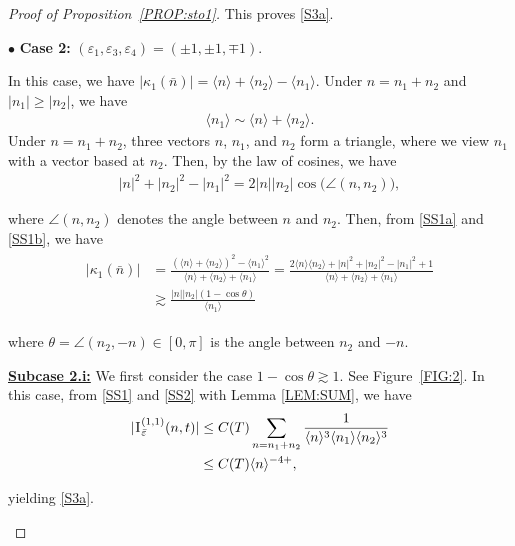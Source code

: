 \documentclass[%
11pt,  reqno]{amsart}
\newcommand{\1}{\hspace{0.2mm}\text{I}\hspace{0.2mm}}
\newcommand{\noi}{\noindent}
\newcommand{\eps}{\varepsilon}
\newcommand{\kk}{\kappa}
\newcommand{\ta}{\theta}
\newcommand{\ges}{\gtrsim}
\newcommand{\jb}[1]
{\langle #1 \rangle}
\numberwithin{equation}{section}
\numberwithin{theorem}{section}
\begin{document}
\begin{proof}[Proof of Proposition~\ref{PROP:sto1}]
\noi
This proves \eqref{S3a}.

\medskip

\noi
$\bullet$ {\bf Case 2:}
$(\eps_1, \eps_3, \eps_4) = (\pm 1, \pm1, \mp1)$.

In this case, we have
$|\kk_1(\bar n)|=  \jb{n} + \jb{n_2} -\jb{n_1}$.
Under $n = n_1 + n_2$
and  $|n_1| \geq |n_2|$, we have 
\begin{align}
\jb{n_1} \sim \jb{n}+ \jb{n_2}.
\label{SS1a}
\end{align}
Under $ n = n_1 + n_2$, 
three vectors $n$, $n_1$, and $n_2$ form a triangle,
where we view $n_1$ with a vector based at $n_2$.
Then, 
by the law of cosines, we have
\begin{align}
|n|^2 + |n_2|^2 - |n_1|^2 = 2 |n| |n_2| \cos \big( \angle(n, n_2)\big),  
\label{SS1b}
\end{align}

\noi
where
$\angle(n, n_2)$ denotes the angle between $n$ and $n_2$.
Then, from \eqref{SS1a} and \eqref{SS1b}, 
we have
\begin{align}
\begin{split}
|\kk_1(\bar n)| 
& =  \frac{(\jb{n} + \jb{n_2})^2 -\jb{n_1}^2}
{\jb{n} + \jb{n_2} +\jb{n_1}}
  =  \frac{2\jb{n}\jb{n_2} + |n|^2 + |n_2|^2 - |n_1|^2 + 1}
{\jb{n} + \jb{n_2} +\jb{n_1}}\\
& 
\ges
 \frac{|n| |n_2| (1 - \cos \theta)}
{\jb{n_1}} 
\end{split}
\label{SS2}
\end{align}

\noi
where $\ta = \angle(n_2, -n) \in [0, \pi]$ is the angle between $n_2$ and $-n$.



\smallskip
\noi
{\bf \underline{Subcase 2.i:}}
We first consider the case $1 - \cos \ta \ges 1$.
See Figure~\ref{FIG:2}.
In this case, from \eqref{SS1} and \eqref{SS2}
with Lemma \ref{LEM:SUM}, 
we have 
\begin{align}
\begin{split}
|\1^{(1,1)}_{\bar \eps} (n, t)|
& \le C(T)   
\sum_{n = n_1 + n_2} 
\frac{1}{\jb{n}^{3}\jb{n_1} \jb{n_2}^{3}}\\
& \le C(T)   
\jb{n}^{-4+}, 
\end{split}
\label{SS3}
\end{align}

\noi
yielding \eqref{S3a}.

\begin{figure}[h]
\begin{tikzpicture}


\end{tikzpicture}
\end{figure}
\end{proof}
\end{document}
